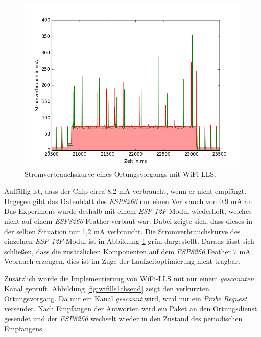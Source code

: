 \begin{figure}[h!]
  \centering
	\includegraphics[width=\textwidth]{plots/wifillssendv.png}
  \caption{Stromverbrauchskurve eines Ortungsvorgangs mit WiFi-LLS.}
  \label{fig:wifillssendv}
\end{figure}

Auffällig ist, dass der Chip circa 8,2 mA verbraucht, wenn er nicht empfängt. 
Dagegen gibt das Datenblatt des \emph{ESP8266} nur einen Verbrauch von 0,9 mA an.
Das Experiment wurde deshalb mit einem \emph{ESP-12F} Modul wiederholt, welches nicht auf einem \emph{ESP8266} Feather verbaut war. 
Dabei zeigte sich, dass dieses in der selben Situation nur 1,2 mA verbraucht.
Die Stromverbrauchskurve des einzelnen \emph{ESP-12F} Modul ist in Abbildung \ref{fig:wifillssendv} grün dargestellt.
Daraus lässt sich schließen, dass die zusätzlichen Komponenten auf dem \emph{ESP8266} Feather 7 mA Vebrauch erzeugen, dies ist im Zuge der Laufzeitoptimierung nicht tragbar.

Zusätzlich wurde die Implementierung von WiFi-LLS mit nur einem \emph{gescannten} Kanal geprüft.
Abbildung \ref{fig:wifills1chsend} zeigt den verkürzten Ortungsvorgang.
Da nur ein Kanal \emph{gescannt} wird, wird nur ein \emph{Probe Request} versendet.
Nach Empfangen der Antworten wird ein Paket an den Ortungsdienst gesendet und der \emph{ESP8266} wechselt wieder in den Zustand des periodischen Empfangens.


